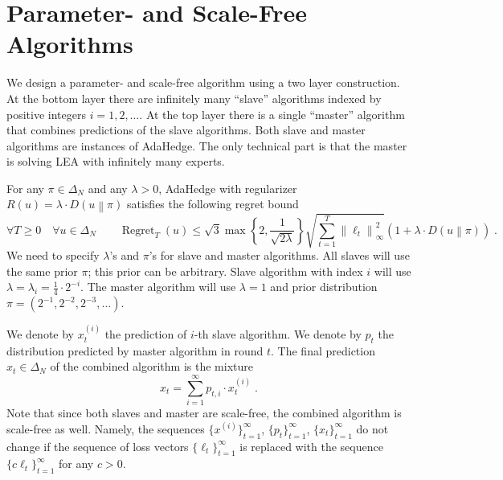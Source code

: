\documentclass[12pt]{article}
\newcommand{\norm}[1]{\left\|#1\right\|}
\newcommand{\KL}[2]{D\left(#1 \middle\| #2 \right)}
\DeclareMathOperator{\Regret}{Regret}
\begin{document}
\section{Parameter- and Scale-Free Algorithms}

We design a parameter- and scale-free algorithm using a two layer construction.
At the bottom layer there are infinitely many ``slave'' algorithms indexed by
positive integers $i=1,2,\dots$. At the top layer there is a single ``master''
algorithm that combines predictions of the slave algorithms.  Both slave and
master algorithms are instances of AdaHedge. The only technical part is that
the master is solving LEA with infinitely many experts.


For any $\pi \in \Delta_N$ and any $\lambda > 0$, AdaHedge with regularizer
$R(u) = \lambda \cdot \KL{u}{\pi}$ satisfies the following regret bound
$$
\forall T \ge 0 \quad \forall u \in \Delta_N \qquad \Regret_T(u) \le \sqrt{3}\max\left\{2, \frac{1}{\sqrt{2 \lambda}}\right\} \sqrt{\sum_{t=1}^T \norm{\ell_t}_\infty^2} \left(1 + \lambda \cdot \KL{u}{\pi} \right) \; .
$$
We need to specify $\lambda$'s and $\pi$'s for slave and master algorithms.
All slaves will use the same prior $\pi$; this prior can be arbitrary.  Slave
algorithm with index $i$ will use $\lambda = \lambda_i = \frac{1}{4} \cdot 2^{-i}$. The master
algorithm will use $\lambda = 1$ and prior distribution $\pi = (2^{-1}, 2^{-2},
2^{-3}, \dots)$.

We denote by $x^{(i)}_t$ the prediction of $i$-th slave algorithm.
We denote by $p_t$ the distribution predicted by master algorithm in round $t$.
The final prediction $x_t \in \Delta_N$ of the combined algorithm is the mixture
$$
x_t = \sum_{i=1}^\infty p_{t,i} \cdot x^{(i)}_t \; .
$$
Note that since both slaves and master are scale-free, the combined algorithm
is scale-free as well. Namely, the sequences $\{x^{(i)}\}_{t=1}^\infty$,
$\{p_t\}_{t=1}^\infty$, $\{x_t\}_{t=1}^\infty$ do not change if the sequence of
loss vectors $\{\ell_t\}_{t=1}^\infty$ is replaced with the sequence $\{c
\ell_t\}_{t=1}^\infty$ for any $c > 0$.
\end{document}
